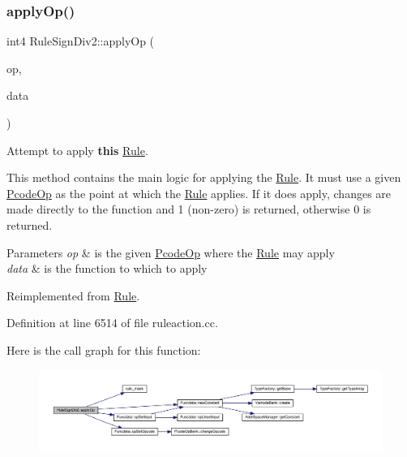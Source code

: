 \subsubsection{\texorpdfstring{applyOp()}{applyOp()}}
{\footnotesize\ttfamily int4 Rule\+Sign\+Div2\+::apply\+Op (\begin{DoxyParamCaption}\item[{\mbox{\hyperlink{class_pcode_op}{Pcode\+Op}} $\ast$}]{op,  }\item[{\mbox{\hyperlink{class_funcdata}{Funcdata}} \&}]{data }\end{DoxyParamCaption})\hspace{0.3cm}{\ttfamily [virtual]}}



Attempt to apply {\bfseries{this}} \mbox{\hyperlink{class_rule}{Rule}}. 

This method contains the main logic for applying the \mbox{\hyperlink{class_rule}{Rule}}. It must use a given \mbox{\hyperlink{class_pcode_op}{Pcode\+Op}} as the point at which the \mbox{\hyperlink{class_rule}{Rule}} applies. If it does apply, changes are made directly to the function and 1 (non-\/zero) is returned, otherwise 0 is returned. 
\begin{DoxyParams}{Parameters}
{\em op} & is the given \mbox{\hyperlink{class_pcode_op}{Pcode\+Op}} where the \mbox{\hyperlink{class_rule}{Rule}} may apply \\
\hline
{\em data} & is the function to which to apply \\
\hline
\end{DoxyParams}


Reimplemented from \mbox{\hyperlink{class_rule_a4e3e61f066670175009f60fb9dc60848}{Rule}}.



Definition at line 6514 of file ruleaction.\+cc.

Here is the call graph for this function\+:
\nopagebreak
\begin{figure}[H]
\begin{center}
\leavevmode
\includegraphics[width=350pt]{class_rule_sign_div2_a2c19f27ad4e779fd9fc6a4bce1e16be5_cgraph}
\end{center}
\end{figure}
\mbox{\label{class_rule_sign_div2_a6aa73406ff551ac7714f12d17eb12d39}} 
